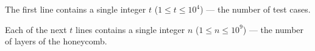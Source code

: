 The first line contains a single integer $t$ ($1 \le t \le 10^4$) --- the number of test cases.

Each of the next $t$ lines contains a single integer $n$ ($1 \le n \le 10^9$) --- the number of layers of the honeycomb.
